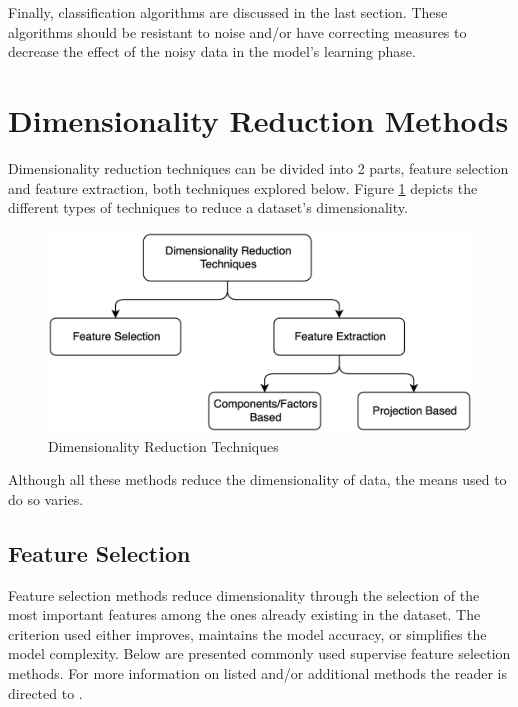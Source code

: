 \documentclass[12pt, english, openany]{book}
\begin{document}
Finally, classification algorithms are discussed in the last section. These
algorithms should be resistant to noise and/or have correcting measures to
decrease the effect of the noisy data in the model's learning phase.

\section{Dimensionality Reduction Methods}
Dimensionality reduction techniques can be divided into 2 parts, feature
selection and feature extraction, both techniques explored below. Figure
\ref{fig:dimensionality-reduction} depicts the different types of techniques to
reduce a dataset's dimensionality.

\begin{figure}[H]
	\centering
	\includegraphics[width=.8\linewidth]{dimensionality_reduction.png}
  \caption{Dimensionality Reduction Techniques}
  \label{fig:dimensionality-reduction}
\end{figure}

Although all these methods reduce the dimensionality of data, the means used to
do so varies.

\subsection*{Feature Selection}

Feature selection methods reduce dimensionality through the selection of the
most important features among the ones already existing in the dataset. The
criterion used either improves, maintains the model accuracy, or simplifies the
model complexity. Below are presented commonly used supervise feature selection
methods. For more information on listed and/or additional methods the reader is
directed to \cite{Cai2018, Ghojogh2019}.
\end{document}
